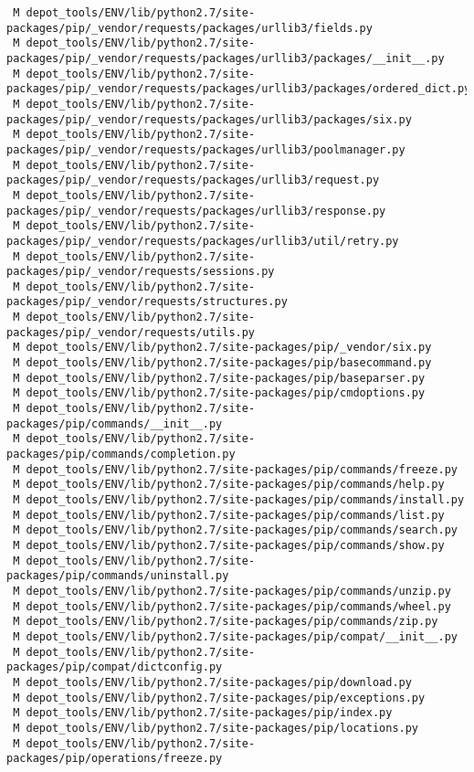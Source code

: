 \documentclass{article}
\begin{document}
\begin{verbatim}
 M depot_tools/ENV/lib/python2.7/site-packages/pip/_vendor/requests/packages/urllib3/fields.py
 M depot_tools/ENV/lib/python2.7/site-packages/pip/_vendor/requests/packages/urllib3/packages/__init__.py
 M depot_tools/ENV/lib/python2.7/site-packages/pip/_vendor/requests/packages/urllib3/packages/ordered_dict.py
 M depot_tools/ENV/lib/python2.7/site-packages/pip/_vendor/requests/packages/urllib3/packages/six.py
 M depot_tools/ENV/lib/python2.7/site-packages/pip/_vendor/requests/packages/urllib3/poolmanager.py
 M depot_tools/ENV/lib/python2.7/site-packages/pip/_vendor/requests/packages/urllib3/request.py
 M depot_tools/ENV/lib/python2.7/site-packages/pip/_vendor/requests/packages/urllib3/response.py
 M depot_tools/ENV/lib/python2.7/site-packages/pip/_vendor/requests/packages/urllib3/util/retry.py
 M depot_tools/ENV/lib/python2.7/site-packages/pip/_vendor/requests/sessions.py
 M depot_tools/ENV/lib/python2.7/site-packages/pip/_vendor/requests/structures.py
 M depot_tools/ENV/lib/python2.7/site-packages/pip/_vendor/requests/utils.py
 M depot_tools/ENV/lib/python2.7/site-packages/pip/_vendor/six.py
 M depot_tools/ENV/lib/python2.7/site-packages/pip/basecommand.py
 M depot_tools/ENV/lib/python2.7/site-packages/pip/baseparser.py
 M depot_tools/ENV/lib/python2.7/site-packages/pip/cmdoptions.py
 M depot_tools/ENV/lib/python2.7/site-packages/pip/commands/__init__.py
 M depot_tools/ENV/lib/python2.7/site-packages/pip/commands/completion.py
 M depot_tools/ENV/lib/python2.7/site-packages/pip/commands/freeze.py
 M depot_tools/ENV/lib/python2.7/site-packages/pip/commands/help.py
 M depot_tools/ENV/lib/python2.7/site-packages/pip/commands/install.py
 M depot_tools/ENV/lib/python2.7/site-packages/pip/commands/list.py
 M depot_tools/ENV/lib/python2.7/site-packages/pip/commands/search.py
 M depot_tools/ENV/lib/python2.7/site-packages/pip/commands/show.py
 M depot_tools/ENV/lib/python2.7/site-packages/pip/commands/uninstall.py
 M depot_tools/ENV/lib/python2.7/site-packages/pip/commands/unzip.py
 M depot_tools/ENV/lib/python2.7/site-packages/pip/commands/wheel.py
 M depot_tools/ENV/lib/python2.7/site-packages/pip/commands/zip.py
 M depot_tools/ENV/lib/python2.7/site-packages/pip/compat/__init__.py
 M depot_tools/ENV/lib/python2.7/site-packages/pip/compat/dictconfig.py
 M depot_tools/ENV/lib/python2.7/site-packages/pip/download.py
 M depot_tools/ENV/lib/python2.7/site-packages/pip/exceptions.py
 M depot_tools/ENV/lib/python2.7/site-packages/pip/index.py
 M depot_tools/ENV/lib/python2.7/site-packages/pip/locations.py
 M depot_tools/ENV/lib/python2.7/site-packages/pip/operations/freeze.py

\end{verbatim}
\end{document}
